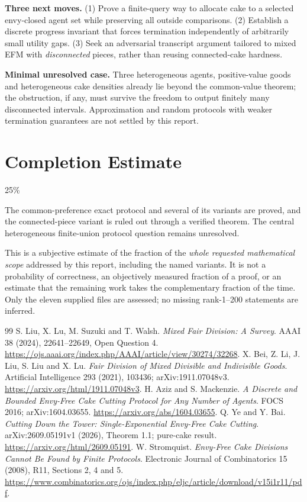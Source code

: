 \documentclass[11pt,a4paper]{article}
\theoremstyle{remark}\newtheorem{remark}[theorem]{Remark}
\begin{document}
\textbf{Three next moves.} (1) Prove a finite-query way to allocate cake to a selected envy-closed agent set while preserving all outside comparisons. (2) Establish a discrete progress invariant that forces termination independently of arbitrarily small utility gaps. (3) Seek an adversarial transcript argument tailored to mixed EFM with \emph{disconnected} pieces, rather than reusing connected-cake hardness.

\textbf{Minimal unresolved case.} Three heterogeneous agents, positive-value goods and heterogeneous cake densities already lie beyond the common-value theorem; the obstruction, if any, must survive the freedom to output finitely many disconnected intervals. Approximation and random protocols with weaker termination guarantees are not settled by this report.

\section{Completion Estimate}
25\%

The common-preference exact protocol and several of its variants are proved, and the connected-piece variant is ruled out through a verified theorem. The central heterogeneous finite-union protocol question remains unresolved.

This is a subjective estimate of the fraction of the \emph{whole requested mathematical scope} addressed by this report, including the named variants. It is not a probability of correctness, an objectively measured fraction of a proof, or an estimate that the remaining work takes the complementary fraction of the time. Only the eleven supplied files are assessed; no missing rank-1--200 statements are inferred.

\begin{thebibliography}{99}
 S. Liu, X. Lu, M. Suzuki and T. Walsh. \emph{Mixed Fair Division: A Survey}. AAAI 38 (2024), 22641--22649, Open Question 4. \url{https://ojs.aaai.org/index.php/AAAI/article/view/30274/32268}.
 X. Bei, Z. Li, J. Liu, S. Liu and X. Lu. \emph{Fair Division of Mixed Divisible and Indivisible Goods}. Artificial Intelligence 293 (2021), 103436; arXiv:1911.07048v3. \url{https://arxiv.org/html/1911.07048v3}.
 H. Aziz and S. Mackenzie. \emph{A Discrete and Bounded Envy-Free Cake Cutting Protocol for Any Number of Agents}. FOCS 2016; arXiv:1604.03655. \url{https://arxiv.org/abs/1604.03655}.
 Q. Ye and Y. Bai. \emph{Cutting Down the Tower: Single-Exponential Envy-Free Cake Cutting}. arXiv:2609.05191v1 (2026), Theorem 1.1; pure-cake result. \url{https://arxiv.org/html/2609.05191}.
 W. Stromquist. \emph{Envy-Free Cake Divisions Cannot Be Found by Finite Protocols}. Electronic Journal of Combinatorics 15 (2008), R11, Sections 2, 4 and 5. \url{https://www.combinatorics.org/ojs/index.php/eljc/article/download/v15i1r11/pdf}.
\end{thebibliography}
\end{document}
